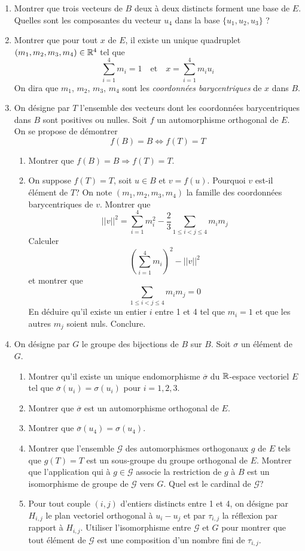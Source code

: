 \begin{enumerate}
\item Montrer que trois vecteurs de $B$ deux {\`a} deux distincts forment une base de $E$. Quelles sont les composantes du vecteur $u_4$ dans la base $\{u_1,u_2,u_3\}$ ?
\item Montrer que pour tout $x$ de $E$, il existe un unique quadruplet $(m_1,m_2,m_3,m_4)\in \mathbb{R}^4$ tel que
\[ \sum_{i=1}^4 m_i=1 \quad \text{et} \quad x=\sum_{i=1}^4m_iu_i\]
On dira que $m_1$, $m_2$, $m_3$, $m_4$ sont les \emph{coordonnées barycentriques} de $x$ dans $B$.
\item On d{\'e}signe par $T$ l'ensemble des vecteurs dont les coordonnées barycentriques dans $B$ sont positives ou nulles. Soit $f$ un automorphisme orthogonal de $E$. On se propose de d{\'e}montrer 
\begin{displaymath}
 f(B)=B \Leftrightarrow f(T)=T
\end{displaymath}
\begin{enumerate}
\item Montrer que $f(B)=B \Rightarrow f(T)=T $.
\item On suppose $f(T)=T$, soit $u\in B$ et $v=f(u)$.\newline
Pourquoi $v$ est-il {\'e}l{\'e}ment de $T$?\newline
On note $(m_1,m_2,m_3,m_4)$ la famille des coordonnées barycentriques de $v$. Montrer que
\[||v||^2=\sum_{i=1}^4m_i^2-\frac{2}{3}\sum_{1\leq i < j \leq  4}m_im_j\]
Calculer
\[\left( \sum_{i=1}^4m_i \right)^2-||v||^2\]
et montrer que
\[\sum_{1\leq i < j \leq 4}m_im_j=0\]
En d{\'e}duire qu'il existe un entier $i$ entre 1 et 4 tel que $m_i=1$ et que les autres $m_j$ soient nuls. Conclure.
\end{enumerate}
\item On d{\'e}signe par $G$ le groupe des bijections de $B$ sur $B$. Soit $\sigma$ un {\'e}l{\'e}ment de $G$.
\begin{enumerate}
\item Montrer qu'il existe un unique endomorphisme $\overline{\sigma}$ du $\mathbb{R}$-espace vectoriel $E$ tel que $\overline{\sigma}(u_i)=\sigma(u_i)$ pour $i=1,2,3$.
\item Montrer que $\overline{\sigma}$ est un automorphisme orthogonal de $E$.
\item Montrer que  $\overline{\sigma}(u_4)=\sigma(u_4)$.
\item Montrer que l'ensemble $\mathcal{G}$ des automorphismes orthogonaux $g$ de $E$ tels que $g(T)=T$ est un sous-groupe du groupe orthogonal de $E$.\newline
Montrer que l'application qui {\`a} $g\in \mathcal{G}$ associe la restriction de $g$ {\`a} $B$ est un isomorphisme de groupe de $\mathcal{G}$ vers $G$. Quel est le cardinal de $\mathcal{G}$?
\item Pour tout couple $(i,j)$ d'entiers distincts entre 1 et 4, on d{\'e}signe par $H_{i,j}$ le plan vectoriel orthogonal {\`a} $u_i-u_j$ et par $\tau_{i,j}$ la r{\'e}flexion par rapport {\`a} $H_{i,j}$. Utiliser l'isomorphisme entre $\mathcal{G}$ et $G$ pour montrer que tout
{\'e}l{\'e}ment de $\mathcal{G}$ est une composition d'un nombre fini de $\tau_{i,j}$.
\end{enumerate}
\end{enumerate}
